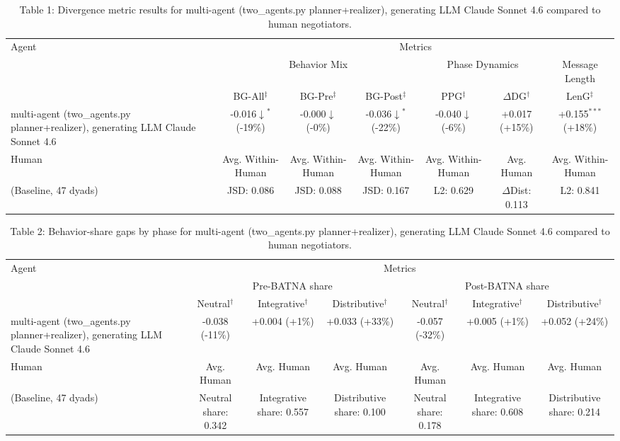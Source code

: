 \begin{table}[t]
\centering
\begin{tabular}{lcccccc}
\toprule
\multirow{3}{*}{Agent} & \multicolumn{6}{c}{Metrics} \\
\cmidrule(lr){2-7}
 & \multicolumn{3}{c}{Behavior Mix} & \multicolumn{2}{c}{Phase Dynamics} & \multicolumn{1}{c}{Message Length} \\
\cmidrule(lr){2-4} \cmidrule(lr){5-6} \cmidrule(lr){7-7}
 & BG-All$^\ddagger$ & BG-Pre$^\ddagger$ & BG-Post$^\ddagger$ & PPG$^\ddagger$ & $\Delta$DG$^\dagger$ & LenG$^\ddagger$ \\
\midrule
multi-agent (two_agents.py planner+realizer), generating LLM Claude Sonnet 4.6 & -0.016$\downarrow$$^{*}$ (-19\%) & -0.000$\downarrow$ (-0\%) & -0.036$\downarrow$$^{*}$ (-22\%) & -0.040$\downarrow$ (-6\%) & +0.017 (+15\%) & +0.155$^{***}$ (+18\%) \\
\midrule
Human & Avg. Within-Human & Avg. Within-Human & Avg. Within-Human & Avg. Within-Human & Avg. Human & Avg. Within-Human \\
(Baseline, 47 dyads) & JSD: 0.086 & JSD: 0.088 & JSD: 0.167 & L2: 0.629 & $\Delta$Dist: 0.113 & L2: 0.841 \\
\bottomrule
\end{tabular}
\caption{Table 1: Divergence metric results for multi-agent (two_agents.py planner+realizer), generating LLM Claude Sonnet 4.6 compared to human negotiators.}
\end{table}

\begin{table}[t]
\centering
\begin{tabular}{lcccccc}
\toprule
\multirow{3}{*}{Agent} & \multicolumn{6}{c}{Metrics} \\
\cmidrule(lr){2-7}
 & \multicolumn{3}{c}{Pre-BATNA share} & \multicolumn{3}{c}{Post-BATNA share} \\
\cmidrule(lr){2-4} \cmidrule(lr){5-7}
 & Neutral$^\dagger$ & Integrative$^\dagger$ & Distributive$^\dagger$ & Neutral$^\dagger$ & Integrative$^\dagger$ & Distributive$^\dagger$ \\
\midrule
multi-agent (two_agents.py planner+realizer), generating LLM Claude Sonnet 4.6 & -0.038 (-11\%) & +0.004 (+1\%) & +0.033 (+33\%) & -0.057 (-32\%) & +0.005 (+1\%) & +0.052 (+24\%) \\
\midrule
Human & Avg. Human & Avg. Human & Avg. Human & Avg. Human & Avg. Human & Avg. Human \\
(Baseline, 47 dyads) & Neutral share: 0.342 & Integrative share: 0.557 & Distributive share: 0.100 & Neutral share: 0.178 & Integrative share: 0.608 & Distributive share: 0.214 \\
\bottomrule
\end{tabular}
\caption{Table 2: Behavior-share gaps by phase for multi-agent (two_agents.py planner+realizer), generating LLM Claude Sonnet 4.6 compared to human negotiators.}
\end{table}
